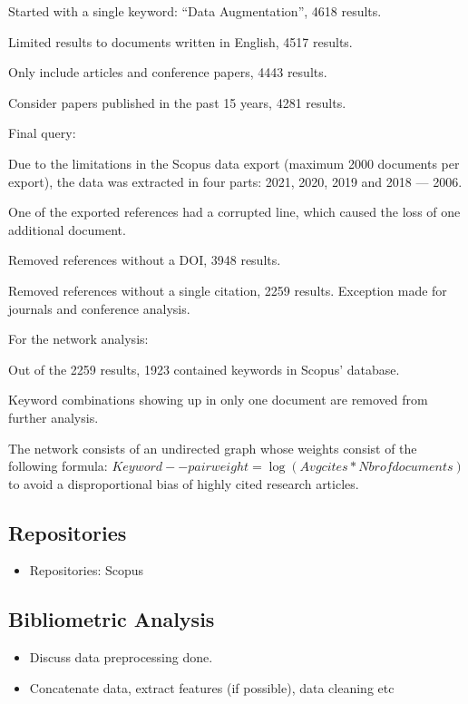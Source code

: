 \documentclass[parskip=full]{scrartcl}
\begin{document}
Started with a single keyword: ``Data Augmentation'', 4618 results.

Limited results to documents written in English, 4517 results.

Only include articles and conference papers, 4443 results.

Consider papers published in the past 15 years, 4281 results.

Final query:

Due to the limitations in the Scopus data export (maximum 2000 documents per
export), the data was extracted in four parts: 2021, 2020, 2019 and 2018 --- 2006.

One of the exported references had a corrupted line, which caused the loss of one
additional document.

Removed references without a DOI, 3948 results.

Removed references without a single citation, 2259 results. Exception made for
journals and conference analysis.  



For the network analysis:

Out of the 2259 results, 1923 contained keywords in Scopus' database.

Keyword combinations showing up in only one document are removed from further
analysis.

The network consists of an undirected graph whose weights consist of the
following formula: $Keyword--pair weight = \log(Avg cites * Nbr of documents)$
to avoid a disproportional bias of highly cited research articles.


\subsection{Repositories}

\begin{itemize}
    \item Repositories: Scopus
\end{itemize}

\subsection{Bibliometric Analysis}

\begin{itemize}
    \item Discuss data preprocessing done.
    \item Concatenate data, extract features (if possible), data cleaning etc
\end{itemize}
\end{document}
